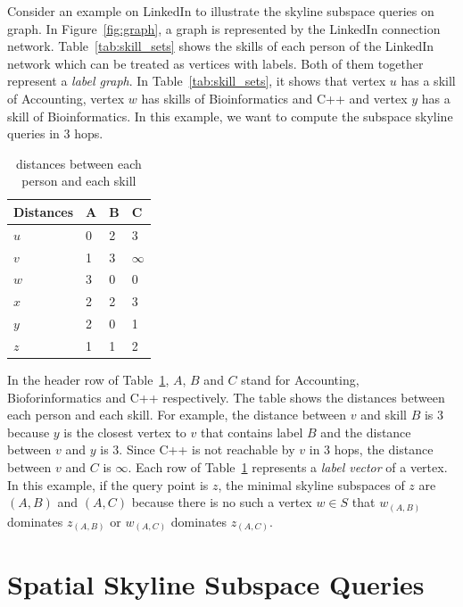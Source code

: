 Consider an example on LinkedIn to illustrate the skyline subspace queries on graph. In Figure~\ref{fig:graph}, a graph is represented by the LinkedIn connection network. Table~\ref{tab:skill_sets} shows the skills of each person of the LinkedIn network which can be treated as vertices with labels. 
Both of them together represent a \emph{label graph}. In Table~\ref{tab:skill_sets}, it shows that vertex $u$ has a skill of Accounting, vertex $w$ has skills of Bioinformatics and C++ and vertex $y$ has a skill of Bioinformatics. In this example, we want to compute the subspace skyline queries in $3$ hops.

\begin{table}[h]
    \centering
    \begin{tabular}{llll}
    \hline
        Distances & A & B & C \\ \hline
        $u$       & 0 & 2 & 3 \\ \hline
        $v$       & 1 & 3 & $\infty$ \\ \hline
        $w$       & 3 & 0 & 0 \\ \hline
        $x$       & 2 & 2 & 3 \\ \hline
        $y$       & 2 & 0 & 1 \\ \hline
        $z$       & 1 & 1 & 2 \\ \hline
    \end{tabular}
    \caption{\label{tab:distances_graph} distances between each person and each skill}
    
\end{table}

In the header row of Table~\ref{tab:distances_graph}, $A$, $B$ and $C$ stand for Accounting, Bioforinformatics and C++ respectively. The table shows the distances between each person and each skill. For example, the distance between $v$ and skill $B$ is $3$ because $y$ is the closest vertex to $v$ that contains label $B$ and the distance between $v$ and $y$ is $3$. Since C++ is not reachable by $v$ in $3$ hops, the distance between $v$ and $C$ is $\infty$. Each row of Table~\ref{tab:distances_graph} represents a \emph{label vector} of a vertex.
In this example, if the query point is $z$, the minimal skyline subspaces of $z$ are $(A, B)$ and $(A, C)$ because there is no such a vertex $w \in S$ that $w_{(A,B)}$ dominates $z_{(A,B)}$ or $w_{(A,C)}$ dominates $z_{(A,C)}$.


\section{Spatial Skyline Subspace Queries}

